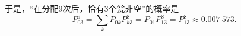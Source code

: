 \begin{example}
\begin{solution}
于是，“在分配9次后，恰有3个瓮非空”的概率是\begin{equation*}
	P_{03}^9
	= \sum_k P_{0k} P_{k3}^8
	= P_{01} P_{13}^8
	= P_{13}^8
	\approx 0.007~573.
\end{equation*}
\end{solution}
\end{example}
